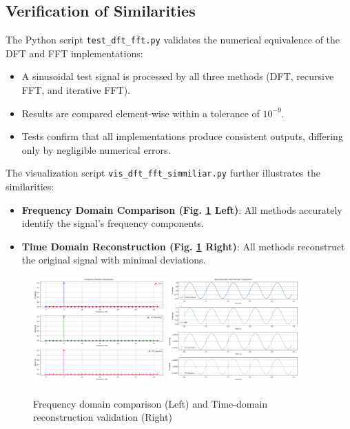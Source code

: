 \documentclass[12pt, a4paper]{report}
\begin{document}
\subsection{Verification of Similarities}
The Python script \texttt{test\_dft\_fft.py} validates the numerical equivalence of the \ac{DFT} and \ac{FFT} implementations:
\begin{itemize}
	\item A sinusoidal test signal is processed by all three methods (\ac{DFT}, recursive \ac{FFT}, and iterative \ac{FFT}).
	\item Results are compared element-wise within a tolerance of \(10^{-9}\).
	\item Tests confirm that all implementations produce consistent outputs, differing only by negligible numerical errors.
\end{itemize}
\noindent The visualization script \texttt{vis\_dft\_fft\_simmiliar.py} further illustrates the similarities:
\begin{itemize}
	\item \textbf{Frequency Domain Comparison (Fig. \ref{fig:frequency_domain_comparison} Left)}: All methods accurately identify the signal's frequency components.
	\item \textbf{Time Domain Reconstruction (Fig. \ref{fig:frequency_domain_comparison} Right)}: All methods reconstruct the original signal with minimal deviations.
\end{itemize}

\begin{figure}[h!]
	\centering
	\includegraphics[width=0.45\textwidth]{2023_11_29_Bilder_Dokumentation/Frequency_Domain_Comparison.png}
	\includegraphics[width=0.45\textwidth]{2023_11_29_Bilder_Dokumentation/Time_Domain_Comparison.png}
	\caption{Frequency domain comparison (Left) and Time-domain reconstruction validation (Right)}
	\label{fig:frequency_domain_comparison}
\end{figure}
\end{document}
